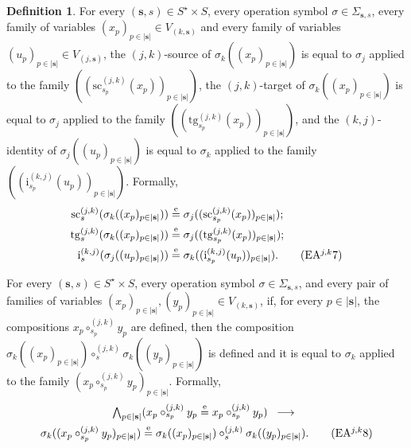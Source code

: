 \documentclass[a4paper, reqno
]{amsart}
\newcommand{\eeq}{\overset{\mathrm e}{=}}      %
\newcommand{\src}{\mathrm{sc}}
\newcommand{\tgt}{\mathrm{tg}}
\theoremstyle{plain}
\theoremstyle{definition}
\newtheorem{definition}[theorem]{Definition}
\begin{document}
\begin{definition}
For every $(\mathbf{s},s)\in S^{\star}\times S$, every operation symbol $\sigma\in \Sigma_{\mathbf{s},s}$, every family of variables $(x_{p})_{p\in \lvert\mathbf{s}\rvert}\in V_{(k,\mathbf{s})}$ and every family of variables $(u_{p})_{p\in \lvert\mathbf{s}\rvert}\in V_{(j,\mathbf{s})}$, the $(j,k)$-source of $\sigma_{k}((x_{p})_{p\in \lvert\mathbf{s}\rvert})$ is equal to $\sigma_{j}$ applied to the family $((\src^{(j,k)}_{s_{p}}(x_{p}))_{p\in \lvert\mathbf{s}\rvert})$, the $(j,k)$-target of $\sigma_{k}((x_{p})_{p\in \lvert\mathbf{s}\rvert})$ is equal to $\sigma_{j}$ applied to the family $((\tgt^{(j,k)}_{s_{p}}(x_{p}))_{p\in \lvert\mathbf{s}\rvert})$, and the $(k,j)$-identity of $\sigma_{j}((u_{p})_{p\in \lvert\mathbf{s}\rvert})$ is equal to $\sigma_{k}$ applied to the family $((\mathrm{i}^{(k,j)}_{s_{p}}(u_{p}))_{p\in \lvert\mathbf{s}\rvert})$.
Formally,
\begin{align*}
\src^{(j,k)}_{s}(\sigma_{k}((x_{p})_{p\in \lvert\mathbf{s}\rvert}))&\eeq\sigma_{j}((\src^{(j,k)}_{s_{p}}(x_{p}))_{p\in \lvert\mathbf{s}\rvert});\\
\tgt^{(j,k)}_{s}(\sigma_{k}((x_{p})_{p\in \lvert\mathbf{s}\rvert}))&\eeq\sigma_{j}((\tgt^{(j,k)}_{s_{p}}(x_{p}))_{p\in \lvert\mathbf{s}\rvert});\\
\mathrm{i}^{(k,j)}_{s}(\sigma_{j}((u_{p})_{p\in \lvert\mathbf{s}\rvert}))&\eeq\sigma_{k}((\mathrm{i}^{(k,j)}_{s_{p}}(u_{p}))_{p\in \lvert\mathbf{s}\rvert}).\label{AGlobularAjk7}\tag{EA$^{j,k}$7}
\end{align*}

For every $(\mathbf{s},s)\in S^{\star}\times S$, every operation symbol $\sigma\in \Sigma_{\mathbf{s},s}$, and every pair of families of variables $(x_{p})_{p\in \lvert\mathbf{s}\rvert}, (y_{p})_{p\in \lvert\mathbf{s}\rvert}\in V_{(k,\mathbf{s})}$, if, for every $p\in \lvert\mathbf{s}\rvert$, the compositions $x_{p}\circ^{(j,k)}_{s_{p}}y_{p}$ are defined, then the composition $\sigma_{k}((x_{p})_{p\in \lvert\mathbf{s}\rvert})\circ^{(j,k)}_{s}\sigma_{k}((y_{p})_{p\in \lvert\mathbf{s}\rvert})$ is defined and it is equal to $\sigma_{k}$ applied to the family $(x_{p}\circ^{(j,k)}_{s_{p}}y_{p})_{p\in \lvert\mathbf{s}\rvert}$.
Formally,
\begin{multline*}
\textstyle
\bigwedge_{p\in \lvert\mathbf{s}\rvert}
(x_{p}\circ^{(j,k)}_{s_{p}} y_{p}\eeq x_{p}\circ^{(j,k)}_{s_{p}} y_{p})
\;\;\longrightarrow\;\;\\
\sigma_{k}((x_{p}\circ^{(j,k)}_{s_{p}}y_{p})_{p\in \lvert\mathbf{s}\rvert})
\eeq
\sigma_{k}((x_{p})_{p\in \lvert\mathbf{s}\rvert})\circ^{(j,k)}_{s}\sigma_{k}((y_{p})_{p\in \lvert\mathbf{s}\rvert}).
\label{AGlobularAjk8}\tag{EA$^{j,k}$8}
\end{multline*}


\end{definition}
\end{document}

